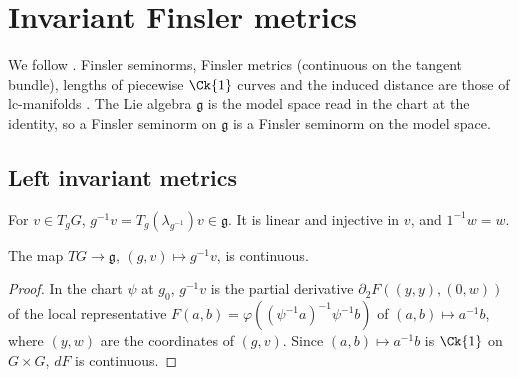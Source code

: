 \chapter{Invariant Finsler metrics}
\label{chap:metrics}

We follow \cite[\S2]{Lar19}. Finsler seminorms, Finsler metrics (continuous on the tangent
bundle), lengths of piecewise $\Ck{1}$ curves and the induced distance are those of
lc-manifolds \cite{LCM}. The Lie algebra $\mathfrak g$ is the model space read in the chart at
the identity, so a Finsler seminorm on $\mathfrak g$ is a Finsler seminorm on the model space.

\section{Left invariant metrics}

\begin{definition}
  \label{def:left-triv}
  \leanok
  For $v \in T_g G$, $g^{-1}v = T_g(\lambda_{g^{-1}})v \in \mathfrak g$. It is linear and
  injective in $v$, and $1^{-1} w = w$.
\end{definition}

\begin{theorem}
  \label{thm:left-triv-continuous}
  \leanok
  The map $TG \to \mathfrak g$, $(g, v) \mapsto g^{-1}v$, is continuous.
\end{theorem}

\begin{proof}
  \leanok
  In the chart $\psi$ at $g_0$, $g^{-1}v$ is the partial derivative $\partial_2 F((y, y), (0, w))$
  of the local representative $F(a, b) = \varphi((\psi^{-1}a)^{-1}\psi^{-1}b)$ of
  $(a, b) \mapsto a^{-1}b$, where $(y, w)$ are the coordinates of $(g, v)$. Since
  $(a, b) \mapsto a^{-1}b$ is $\Ck{1}$ on $G \times G$, $dF$ is continuous.
\end{proof}

